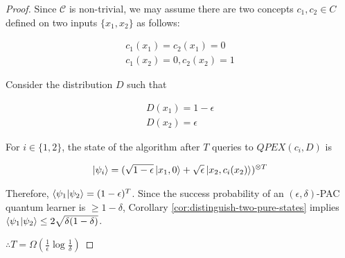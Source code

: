 \documentclass[main.tex]{subfiles}
\begin{document}
\begin{proof} 
Since $\mathcal{C}$ is non-trivial, we may assume there are two concepts $c_1,c_2 \in C$ defined on two inputs $\{x_1,x_2\}$ as follows:

\begin{align*}
 c_1(x_1) = c_2(x_1) = 0\\
 c_1(x_2) = 0,c_2(x_2) = 1
\end{align*}

Consider the distribution $D$ such that

\begin{align*}
D(x_1) = 1-\epsilon\\
D(x_2) = \epsilon
\end{align*}
 
For $i \in \{1,2\}$, the state of the algorithm after $T$ queries to $QPEX(c_i,D)$ is
 
\begin{align*}
 \ket{\psi_i} = (\sqrt{1-\epsilon}\ket{x_1, 0} + \sqrt{\epsilon}\ket{x_2, c_i(x_2)})^{\otimes T}
\end{align*}
 
 Therefore, $\bra{\psi_1}\ket{\psi_2} = (1-\epsilon)^T$. Since the success probability of an $(\epsilon, \delta)$-PAC quantum learner is $\geq 1 - \delta$, Corollary \ref{cor:distinguish-two-pure-states} implies $\bra{\psi_1}\ket{\psi_2} \leq 2\sqrt{\delta(1-\delta)}$. 
 
 $\therefore T = \Omega(\frac{1}{\epsilon}\log \frac{1}{\delta})$
\end{proof}
\end{document}
